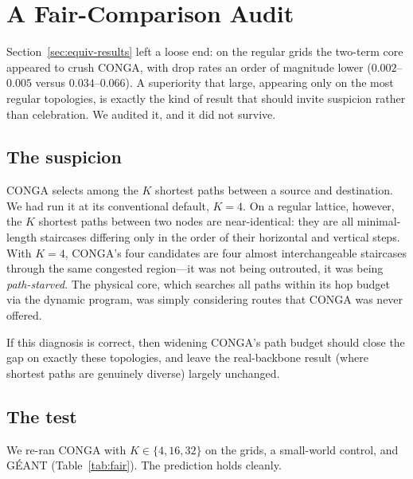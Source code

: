 \section{A Fair-Comparison Audit}
\label{sec:fair}

Section~\ref{sec:equiv-results} left a loose end: on the regular grids the
two-term core appeared to crush CONGA, with drop rates an order of magnitude
lower ($0.002$--$0.005$ versus $0.034$--$0.066$). A superiority that large,
appearing only on the most regular topologies, is exactly the kind of result
that should invite suspicion rather than celebration. We audited it, and it
did not survive.

\subsection{The suspicion}

CONGA selects among the $K$ shortest paths between a source and destination.
We had run it at its conventional default, $K=4$. On a regular lattice,
however, the $K$ shortest paths between two nodes are near-identical: they are
all minimal-length staircases differing only in the order of their horizontal
and vertical steps. With $K=4$, CONGA's four candidates are four almost
interchangeable staircases through the same congested region---it was not
being outrouted, it was being \emph{path-starved}. The physical core, which
searches all paths within its hop budget via the dynamic program, was simply
considering routes that CONGA was never offered.

If this diagnosis is correct, then widening CONGA's path budget should close
the gap on exactly these topologies, and leave the real-backbone result
(where shortest paths are genuinely diverse) largely unchanged.

\subsection{The test}

We re-ran CONGA with $K \in \{4, 16, 32\}$ on the grids, a small-world
control, and G\'EANT (Table~\ref{tab:fair}). The prediction holds cleanly.

